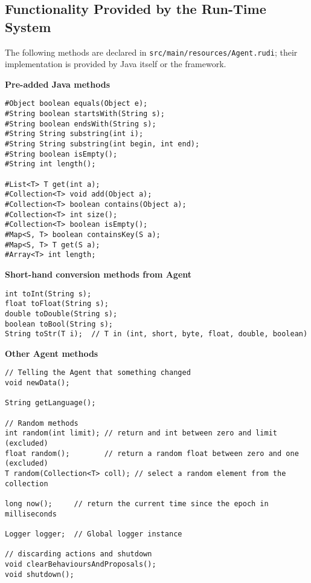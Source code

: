 \subsection{Functionality Provided by the Run-Time System}
The following methods are declared in \texttt{src/main/resources/Agent.rudi};
their implementation is provided by Java itself or the \vonda framework.

\vspace*{2ex}

\newcommand{\pgr}[1]{\noindent\textbf{#1}}

\pgr{Pre-added Java methods}
\begin{small}
\begin{lstlisting}
#Object boolean equals(Object e);
#String boolean startsWith(String s);
#String boolean endsWith(String s);
#String String substring(int i);
#String String substring(int begin, int end);
#String boolean isEmpty();
#String int length();

#List<T> T get(int a);
#Collection<T> void add(Object a);
#Collection<T> boolean contains(Object a);
#Collection<T> int size();
#Collection<T> boolean isEmpty();
#Map<S, T> boolean containsKey(S a);
#Map<S, T> T get(S a);
#Array<T> int length;
\end{lstlisting}
\end{small}

\pgr{Short-hand conversion methods from Agent}
\begin{small}
\begin{lstlisting}
int toInt(String s);
float toFloat(String s);
double toDouble(String s);
boolean toBool(String s);
String toStr(T i);  // T in (int, short, byte, float, double, boolean)
\end{lstlisting}
\end{small}

\pgr{Other Agent methods}
\begin{small}
\begin{lstlisting}
// Telling the Agent that something changed
void newData();

String getLanguage();

// Random methods
int random(int limit); // return and int between zero and limit (excluded)
float random();        // return a random float between zero and one (excluded)
T random(Collection<T> coll); // select a random element from the collection

long now();     // return the current time since the epoch in milliseconds

Logger logger;  // Global logger instance

// discarding actions and shutdown
void clearBehavioursAndProposals();
void shutdown();
\end{lstlisting}
\end{small}

